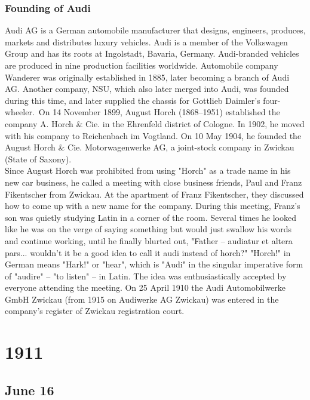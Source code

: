 \documentclass[11pt]{report}
\begin{document}
\subsection{Founding of Audi}
Audi AG is a German automobile manufacturer that designs, engineers, produces, markets and distributes luxury vehicles. Audi is a member of the Volkswagen Group and has its roots at Ingolstadt, Bavaria, Germany. Audi-branded vehicles are produced in nine production facilities worldwide. Automobile company Wanderer was originally established in 1885, later becoming a branch of Audi AG. Another company, NSU, which also later merged into Audi, was founded during this time, and later supplied the chassis for Gottlieb Daimler's four-wheeler.\ On 14 November 1899, August Horch (1868–1951) established the company A. Horch \& Cie. in the Ehrenfeld district of Cologne. In 1902, he moved with his company to Reichenbach im Vogtland. On 10 May 1904, he founded the August Horch \& Cie. Motorwagenwerke AG, a joint-stock company in Zwickau (State of Saxony).\\ \indent Since August Horch was prohibited from using "Horch" as a trade name in his new car business, he called a meeting with close business friends, Paul and Franz Fikentscher from Zwickau. At the apartment of Franz Fikentscher, they discussed how to come up with a new name for the company. During this meeting, Franz's son was quietly studying Latin in a corner of the room. Several times he looked like he was on the verge of saying something but would just swallow his words and continue working, until he finally blurted out, "Father – audiatur et altera pars... wouldn't it be a good idea to call it audi instead of horch?" "Horch!" in German means "Hark!" or "hear", which is "Audi" in the singular imperative form of "audire" – "to listen" – in Latin. The idea was enthusiastically accepted by everyone attending the meeting. On 25 April 1910 the Audi Automobilwerke GmbH Zwickau (from 1915 on Audiwerke AG Zwickau) was entered in the company's register of Zwickau registration court.

\chapter{1911}
\section{June 16}
\end{document}
